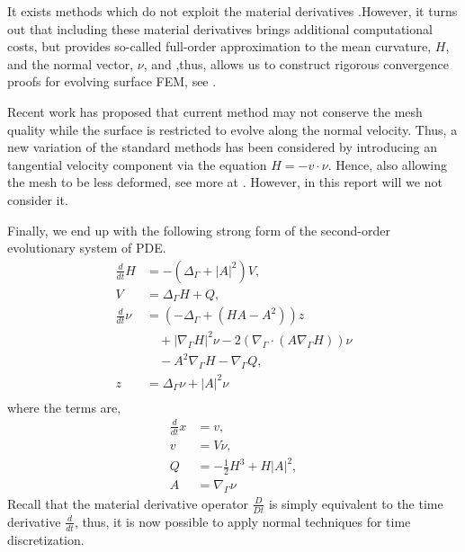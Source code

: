 It exists methods which do not exploit the material derivatives \cite{bonito2010parametric, bartezzaghi2016isogeometric}.However, it turns out that including these material derivatives brings additional computational costs, but provides so-called full-order
approximation to the mean curvature, $H$, and the normal vector, $\nu $, and ,thus, allows us to construct rigorous convergence proofs for evolving surface FEM, see \cite{kovacs2021convergent, binz2022convergent}.

Recent work has proposed that current method may not conserve the mesh quality while the surface is restricted to evolve along the normal velocity. Thus, a new variation of the standard methods has been considered by introducing an tangential
velocity component via the equation  $H = - v\cdot \nu  $. Hence, also allowing the mesh to be less deformed, see more at \cite{hu2022evolving}. However, in this report will we not consider it.

Finally, we end up with the following strong form of the second-order evolutionary system of PDE.
\begin{subequations}
    \label{eq:WE_strong_form}
    \begin{align}
\frac{d}{dt}H & = - \left( \Delta _{\Gamma } + \left\lvert A \right\rvert ^2   \right) V, \\
V  & =   \Delta _{\Gamma } H + Q, \\
\frac{d}{dt} \nu & = \left( -\Delta _{\Gamma } + \left( HA - A^2 \right)  \right) z \nonumber \\
& \quad   + \left\lvert \nabla _{\Gamma } H \right\rvert ^2   \nu - 2\left( \nabla _{\Gamma }\cdot \left( A \nabla _{\Gamma } H \right)  \right) \nu \nonumber  \\
  & \quad  -A^2 \nabla _{\Gamma } H  - \nabla _{\Gamma } Q, \\
z & = \Delta  _{\Gamma } \nu  + \left\lvert A \right\rvert ^2 \nu \\
    \end{align}
\end{subequations}
where the terms are,
\[
    \begin{split}
\frac{d}{dt} x  &= v,\\
v & = V\nu, \\
Q & =  - \frac{1}{2} H^{3} + H \left\lvert A \right\rvert^2, \\
A & = \nabla _{\Gamma } \nu
    \end{split}
\]
Recall that the material derivative operator $\frac{D}{Dt} $ is simply equivalent to the time derivative $\frac{d}{dt}$, thus, it is now possible to apply normal techniques for time discretization.


